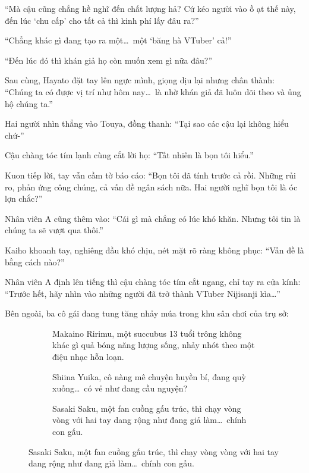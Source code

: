 \documentclass[../main.tex]{subfiles}
\begin{document}
``Mà cậu cũng chẳng hề nghĩ đến chất lượng hả? Cứ kéo người vào ồ ạt thế này, đến lúc `chu cấp' cho tất cả thì kinh phí lấy đâu ra?''

``Chẳng khác gì đang tạo ra một\dots\ một `băng hà VTuber' cả!''

``Đến lúc đó thì khán giả họ còn muốn xem gì nữa đâu?''

Sau cùng, Hayato đặt tay lên ngực mình, giọng dịu lại nhưng chân thành: ``Chúng ta có được vị trí như hôm nay\dots\ là nhờ khán giả đã luôn dõi theo và ủng hộ chúng ta.''

Hai người nhìn thẳng vào Touya, đồng thanh: ``Tại sao các cậu lại không hiểu chứ-''

Cậu chàng tóc tím lạnh cùng cắt lời họ: ``Tất nhiên là bọn tôi hiểu.''

Kuon tiếp lời, tay vẫn cầm tờ báo cáo: ``Bọn tôi đã tính trước cả rồi. Những rủi ro, phản ứng công chúng, cả vấn đề ngân sách nữa. Hai người nghĩ bọn tôi là óc lợn chắc?''

Nhân viên A cũng thêm vào: ``Cái gì mà chẳng có lúc khó khăn. Nhưng tôi tin là chúng ta sẽ vượt qua thôi.''

Kaiho khoanh tay, nghiêng đầu khó chịu, nét mặt rõ ràng không phục: ``Vấn đề là bằng cách nào?''

Nhân viên A định lên tiếng thì cậu chàng tóc tím cắt ngang, chỉ tay ra cửa kính: ``Trước hết, hãy nhìn vào những người đã trở thành VTuber Nijisanji kìa\dots''

Bên ngoài, ba cô gái đang tung tăng nhảy múa trong khu sân chơi của trụ sở:


\begin{figure}[H]
    \centering
    \begin{subfigure}[t]{0.45\textwidth}
        \centering
        \caption{Makaino Ririmu, một succubus 13 tuổi trông không khác gì quả bóng năng lượng sống, nhảy nhót theo một điệu nhạc hỗn loạn.}
    \end{subfigure}
    \quad
    \begin{subfigure}[t]{0.45\textwidth}
        \centering
        \caption{Shiina Yuika, cô nàng mê chuyện huyền bí, đang quỳ xuống\dots\ có vẻ như đang cầu nguyện?}
    \end{subfigure}
    \quad
    \begin{subfigure}[t]{0.45\textwidth}
        \centering
        \caption{Sasaki Saku, một fan cuồng gấu trúc, thì chạy vòng vòng với hai tay dang rộng như đang giả làm\dots\ chính con gấu.}
    \end{subfigure}
\end{figure}
\end{document}
